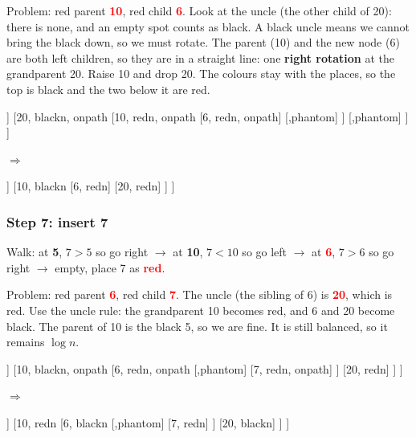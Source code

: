\documentclass[11pt]{article}
\newcommand{\rd}[1]{\textcolor{Red}{\textbf{#1}}}   %
\newcommand{\bk}[1]{\textbf{#1}}                    %
\begin{document}
	Problem: red parent \rd{10}, red child \rd{6}. Look at the uncle (the other child of 20): there is none, and an empty spot counts as black. A black uncle means we cannot bring the black down, so we must rotate. The parent (10) and the new node (6) are both left children, so they are in a straight line: one \textbf{right rotation} at the grandparent 20. Raise 10 and drop 20. The colours stay with the places, so the top is black and the two below it are red.
	\begin{center}
		\begin{forest}
			[5, blackn
			[1, blackn
			[,phantom]
			[4, redn]
			]
			[20, blackn, onpath
			[10, redn, onpath
			[6, redn, onpath]
			[,phantom]
			]
			[,phantom]
			]
			]
		\end{forest}
		\quad$\Rightarrow$\quad
		\begin{forest}
			[5, blackn
			[1, blackn
			[,phantom]
			[4, redn]
			]
			[10, blackn
			[6, redn]
			[20, redn]
			]
			]
		\end{forest}
	\end{center}
	
	\subsubsection*{Step 7: insert 7}
	Walk: at \bk{5}, $7>5$ so go right $\to$ at \bk{10}, $7<10$ so go left $\to$ at \rd{6}, $7>6$ so go right $\to$ empty, place 7 as \rd{red}.
	
	Problem: red parent \rd{6}, red child \rd{7}. The uncle (the sibling of 6) is \rd{20}, which is red. Use the uncle rule: the grandparent 10 becomes red, and 6 and 20 become black. The parent of 10 is the black 5, so we are fine. It is still balanced, so it remains $\log n$.
	\begin{center}
		\begin{forest}
			[5, blackn
			[1, blackn
			[,phantom]
			[4, redn]
			]
			[10, blackn, onpath
			[6, redn, onpath
			[,phantom]
			[7, redn, onpath]
			]
			[20, redn]
			]
			]
		\end{forest}
		\quad$\Rightarrow$\quad
		\begin{forest}
			[5, blackn
			[1, blackn
			[,phantom]
			[4, redn]
			]
			[10, redn
			[6, blackn
			[,phantom]
			[7, redn]
			]
			[20, blackn]
			]
			]
		\end{forest}
	\end{center}
	
\end{document}

